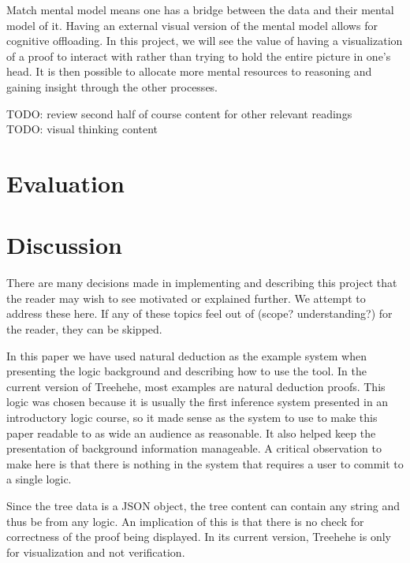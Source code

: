 \documentclass[conference]{IEEEtran}
\newcommand{\projectname}{Treehehe}
\begin{document}
Match mental model means one has a bridge between the data and their mental model of it. Having an external visual version of the mental model allows for cognitive offloading. In this project, we will see the value of having a visualization of a proof to interact with rather than trying to hold the entire picture in one’s head. It is then possible to allocate more mental resources to reasoning and gaining insight through the other processes.

TODO: review second half of course content for other relevant readings \\

TODO: visual thinking content \\

\section{Evaluation}
\label{sec:evaluation}



\section{Discussion}
\label{sec:discussion}

There are many decisions made in implementing and describing this project that the reader may wish to see motivated or explained further. We attempt to address these here. If any of these topics feel out of (scope? understanding?) for the reader, they can be skipped.

In this paper we have used natural deduction as the example system when presenting the logic background and describing how to use the tool. In the current version of \projectname{}, most examples are natural deduction proofs. This logic was chosen because it is usually the first inference system presented in an introductory logic course, so it made sense as the system to use to make this paper readable to as wide an audience as reasonable. It also helped keep the presentation of background information manageable. A critical observation to make here is that there is nothing in the system that requires a user to commit to a single logic.

Since the tree data is a JSON object, the tree content can contain any string and thus be from any logic. An implication of this is that there is no check for correctness of the proof being displayed. In its current version, \projectname{} is only for visualization and not verification.
\end{document}
